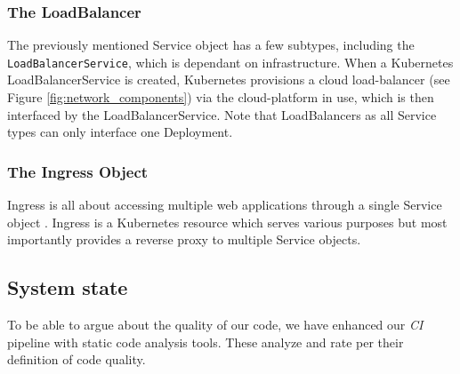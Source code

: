 \subsubsection{The LoadBalancer}
The previously mentioned Service object has a few subtypes, including the \texttt{LoadBalancerService}, which is dependant on infrastructure.
When a Kubernetes LoadBalancerService is created, Kubernetes provisions a cloud load-balancer (see Figure \ref{fig:network_components}) via the cloud-platform in use, which is then interfaced by the LoadBalancerService. Note that LoadBalancers as all Service types can only interface one Deployment.
\subsubsection{The Ingress Object}
Ingress is all about accessing multiple web applications through a single Service object \cite{k8sbook}. 
Ingress is a Kubernetes resource which serves various purposes but most importantly provides a reverse proxy to multiple Service objects.

\subsection{System state}
\label{subsec:system_state}
To be able to argue about the quality of our code, we have enhanced our \textit{CI} pipeline with static code analysis tools. These analyze and rate \mini per their definition of code quality.

